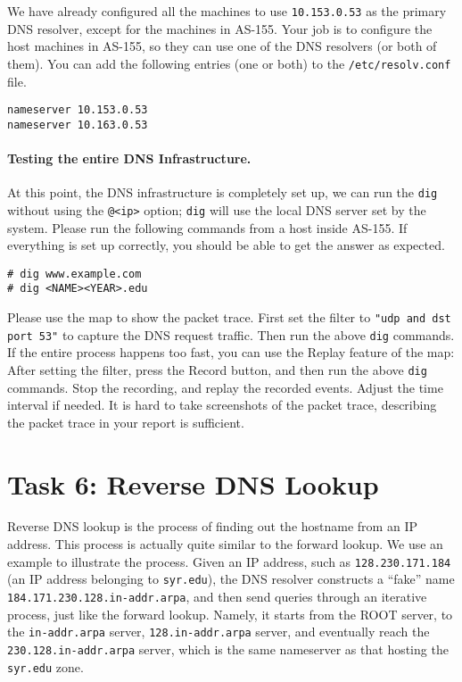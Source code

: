 We have already configured all the machines to use \texttt{10.153.0.53} 
as the primary DNS resolver, except for the machines in AS-155. Your job is to
configure the host machines in AS-155, so they can use one 
of the DNS resolvers (or both of them).
You can add the following entries (one or both) to the 
\texttt{/etc/resolv.conf} file.

\begin{lstlisting}
nameserver 10.153.0.53
nameserver 10.163.0.53
\end{lstlisting}


\paragraph{Testing the entire DNS Infrastructure.} 
At this point, the DNS infrastructure is completely set up,
we can run the \texttt{dig} without using the \texttt{@<ip>} option; 
\texttt{dig} will use the local DNS server set by the system. Please 
run the following commands from a host inside AS-155. If everything 
is set up correctly, you should be able to get the answer as expected. 


\begin{lstlisting}
# dig www.example.com
# dig <NAME><YEAR>.edu 
\end{lstlisting}

Please use the map to show the packet trace. 
First set the filter to \texttt{"udp and dst port 53"} 
to capture the DNS request traffic. Then run the above
\texttt{dig} commands. If the entire process happens too fast, you can
use the Replay feature of the map: After setting the 
filter, press the Record button, and then run the above \texttt{dig}
commands. Stop the recording, and replay the recorded events.
Adjust the time interval if needed. 
It is hard to take screenshots of the packet trace, 
describing the packet trace in your report is sufficient. 




\section{Task 6: Reverse DNS Lookup} 

Reverse DNS lookup is the process of finding out the hostname 
from an IP address. 
This process is actually quite similar to the forward lookup. 
We use an example to illustrate the process. Given an IP address,
such as \texttt{128.230.171.184} (an IP address belonging to
\texttt{syr.edu}), the DNS resolver constructs a ``fake''
name \texttt{184.171.230.128.in-addr.arpa}, and then send queries through an
iterative process, just like the forward lookup. Namely, it starts from the
ROOT server, to the \texttt{in-addr.arpa} server, \texttt{128.in-addr.arpa} server,
and eventually reach the \texttt{230.128.in-addr.arpa} server, which is the
same nameserver as that hosting the \texttt{syr.edu} zone. 

